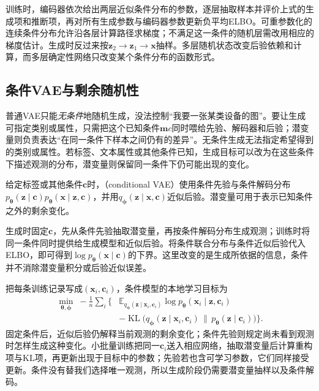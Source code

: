 训练时，编码器依次给出两层近似条件分布的参数，逐层抽取样本并评价上式的生成项和推断项，再对所有生成参数与编码器参数更新负平均ELBO。可重参数化的连续条件分布允许沿各层计算路径求梯度；不满足这一条件的随机层需改用相应的梯度估计。生成时反过来按$\bm z_2\to\bm z_1\to\bm x$抽样。多层随机状态改变后验依赖和计算，而多层确定性网络只改变某个条件分布的函数形式。

\subsection{条件VAE与剩余随机性}

\label{sec:pgm-generative-vae-conditional}

普通VAE只能\emph{无条件}地随机生成，没法控制“我要一张某类设备的图”。要让生成可指定类别或属性，只需把这个已知条件$\bm m c$同时喂给先验、解码器和后验；潜变量则负责表达“在同一条件下样本之间仍有的差异”。无条件生成无法指定希望得到的类别或属性。若标签、文本属性或其他条件已知，生成目标可以改为在这些条件下描述观测的分布，潜变量则保留同一条件下仍可能出现的变化。

给定标签或其他条件$\bm{c}$时，（conditional VAE）使用条件先验与条件解码分布$p_{\bm{\theta}}(\bm{z}\mid\bm{c})p_{\bm{\theta}}(\bm{x}\mid\bm{z},\bm{c})$，并用$q_{\bm{\phi}}(\bm{z}\mid\bm{x},\bm{c})$近似后验。潜变量可用于表示已知条件之外的剩余变化。

生成时固定$\bm c$，先从条件先验抽取潜变量，再按条件解码分布生成观测；训练时将同一条件同时提供给生成模型和近似后验。将条件联合分布与条件近似后验代入ELBO，即可得到$\log p_{\bm\theta}(\bm x\mid\bm c)$的下界。这里改变的是生成所依据的信息，条件并不消除潜变量积分或后验近似误差。

把每条训练记录写成$(\bm x_i,\bm c_i)$，条件模型的本地学习目标为
\begin{equation}
  \label{eq:pgm-generative-conditional-vae-objective}
  \begin{aligned}
    \min_{\bm\theta,\bm\phi}\; -\frac1n\sum_i
      \bigl\{&\mathbb E_{q_{\bm\phi}(\bm z\mid\bm x_i,\bm c_i)}
        \log p_{\bm\theta}(\bm x_i\mid\bm z,\bm c_i)\\
       &-\operatorname{KL}\bigl(q_{\bm\phi}(\bm z\mid\bm x_i,\bm c_i)
                   \,\|\,p_{\bm\theta}(\bm z\mid\bm c_i)\bigr)\bigr\}.
  \end{aligned}
\end{equation}
固定条件后，近似后验仍解释当前观测的剩余变化；条件先验则规定尚未看到观测时怎样生成这种变化。小批量训练把同一$\bm c_i$送入相应网络，抽取潜变量后计算重构项与KL项，再更新出现于目标中的参数；先验若也含可学习参数，它们同样接受更新。条件没有替我们选择唯一观测，所以生成阶段仍需要潜变量抽样以及条件解码。

